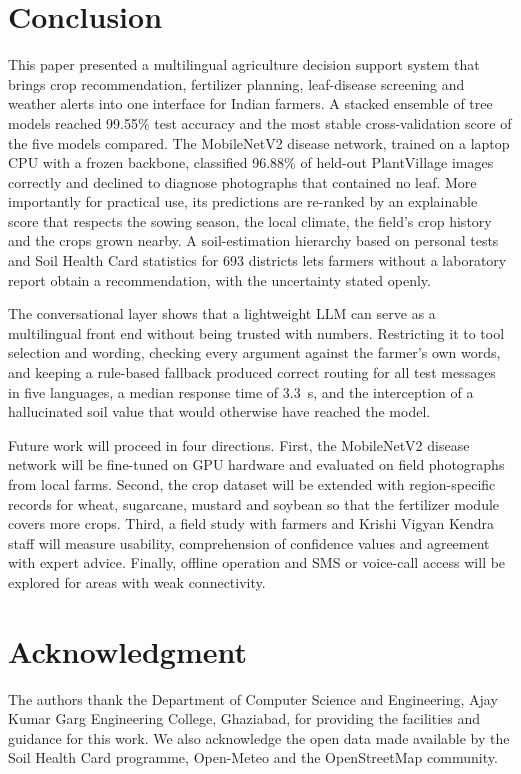 \documentclass[conference]{IEEEtran}
\begin{document}
\section{Conclusion}

This paper presented a multilingual agriculture decision support system that brings crop recommendation, fertilizer planning, leaf-disease screening and weather alerts into one interface for Indian farmers. A stacked ensemble of tree models reached 99.55\% test accuracy and the most stable cross-validation score of the five models compared. The MobileNetV2 disease network, trained on a laptop CPU with a frozen backbone, classified 96.88\% of held-out PlantVillage images correctly and declined to diagnose photographs that contained no leaf. More importantly for practical use, its predictions are re-ranked by an explainable score that respects the sowing season, the local climate, the field's crop history and the crops grown nearby. A soil-estimation hierarchy based on personal tests and Soil Health Card statistics for 693 districts lets farmers without a laboratory report obtain a recommendation, with the uncertainty stated openly.

The conversational layer shows that a lightweight LLM can serve as a multilingual front end without being trusted with numbers. Restricting it to tool selection and wording, checking every argument against the farmer's own words, and keeping a rule-based fallback produced correct routing for all test messages in five languages, a median response time of 3.3~s, and the interception of a hallucinated soil value that would otherwise have reached the model.

Future work will proceed in four directions. First, the MobileNetV2 disease network will be fine-tuned on GPU hardware and evaluated on field photographs from local farms. Second, the crop dataset will be extended with region-specific records for wheat, sugarcane, mustard and soybean so that the fertilizer module covers more crops. Third, a field study with farmers and Krishi Vigyan Kendra staff will measure usability, comprehension of confidence values and agreement with expert advice. Finally, offline operation and SMS or voice-call access will be explored for areas with weak connectivity.

\section*{Acknowledgment}
The authors thank the Department of Computer Science and Engineering, Ajay Kumar Garg Engineering College, Ghaziabad, for providing the facilities and guidance for this work. We also acknowledge the open data made available by the Soil Health Card programme, Open-Meteo and the OpenStreetMap community.
\end{document}
